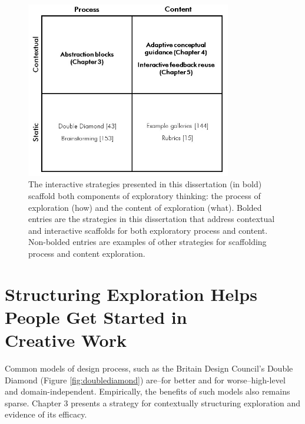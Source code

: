 \begin{figure}[b!]
\centering
  \includegraphics[width=0.8\textwidth]{i_figures/thesis_grid.jpg}
  \caption[The interactive strategies presented in this dissertation (in bold) scaffold both components of exploratory thinking: the process of exploration (how) and the content of exploration (what).]{The interactive strategies presented in this dissertation (in bold) scaffold both components of exploratory thinking: the process of exploration (how) and the content of exploration (what). Bolded entries are the strategies in this dissertation that address contextual and interactive scaffolds for both exploratory process and content. Non-bolded entries are examples of other strategies for scaffolding process and content exploration.}
  \label{fig:thesisgrid}
\end{figure}


\section{Structuring Exploration Helps People Get Started in\\ Creative Work}
Common models of design process, such as the Britain Design Council’s Double Diamond (Figure \ref{fig:doublediamond}) \cite{doublediamond} are--for better and for worse--high-level and domain-independent. Empirically, the benefits of such models also remains sparse. Chapter 3 presents a strategy for contextually structuring exploration and evidence of its efficacy.

